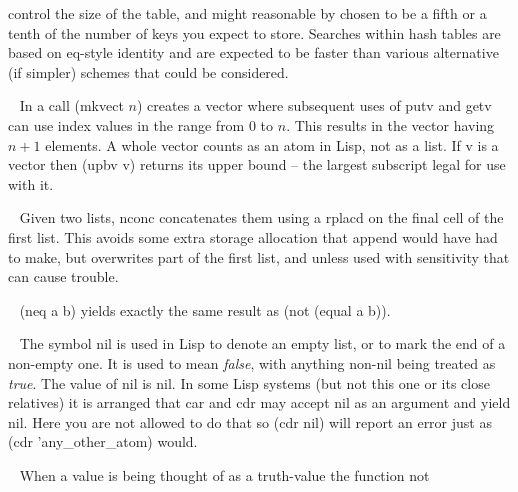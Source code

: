 \begin{description}
control the size of the table,
and might reasonable by chosen to be a fifth or a tenth of the number
of keys you expect to store. Searches within hash tables are based on
{\tx eq}-style identity and are expected to be faster than various
alternative (if simpler) schemes that could be considered.
\item[{\tx mkvect~~~~~~~} \hspace{1cm} {\em function 1 arg}]~\newline
In \vsl{} a call {\tx (mkvect $n$)} creates a vector where subsequent uses
of {\tx putv} and {\tx getv} can use index values in the range from $0$
to $n$. This results in the vector having $n+1$ elements. A whole vector
counts as an atom in Lisp, not as a list.  If {\tx v} is a vector then
{\tx (upbv v)} returns its upper bound -- the largest subscript legal for
use with it.
\item[{\tx nconc~~~~~~~~} \hspace{1cm} {\em function 2 args}]~\newline
Given two lists, {\tx nconc} concatenates them using a {\tx rplacd} on the
final cell of the first list. This avoids some extra storage allocation that
{\tx append} would have had to make, but overwrites part of the
first list, and unless used with sensitivity that can cause trouble.
\item[{\tx neq~~~~~~~~~~} \hspace{1cm} {\em function 2 args}]~\newline
{\tx (neq a b)} yields exactly the same result as {\tx (not (equal a b))}.
\item[{\tx nil~~~~~~~~~~} \hspace{1cm} {\em predefined variable}]~\newline
The symbol {\tx nil} is used in Lisp to denote an empty list, or to mark
the end of a non-empty one. It is used to mean {\em false}, with anything
non-nil being treated as {\em true}. The value of {\tx nil} is {\tx nil}. In
some Lisp systems (but not this one or its close relatives) it is arranged
that {\tx car} and {\tx cdr} may accept {\tx nil} as an argument and yield
{\tx nil}. Here you are not allowed to do that so {\tx (cdr nil)} will
report an error just as {\tx (cdr 'any\_other\_atom)} would.
\item[{\tx not~~~~~~~~~~} \hspace{1cm} {\em function 1 arg}]~\newline
When a value is being thought of as a truth-value the function {\tx not}

\end{description}
